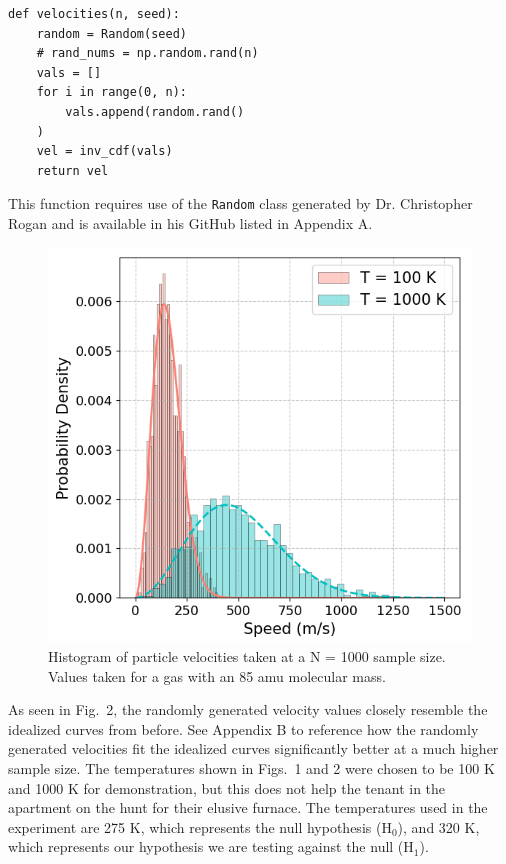 \documentclass[%
 reprint,
 amsmath,amssymb,
 aps,
]{revtex4-2}
\begin{document}
\begin{lstlisting}
def velocities(n, seed):
    random = Random(seed)
    # rand_nums = np.random.rand(n)
    vals = []
    for i in range(0, n):
        vals.append(random.rand()
    )
    vel = inv_cdf(vals)
    return vel
\end{lstlisting}
This function requires use of the \lstinline{Random} class generated by Dr. Christopher Rogan and is available in his GitHub listed in Appendix A. 


\begin{figure}[h]
\caption{Histogram of particle velocities taken at a N = 1000 sample size. Values taken for a gas with an 85 amu molecular mass.}
\centering
	\includegraphics[scale=0.51]{code1}
\end{figure}

As seen in Fig.\ 2, the randomly generated velocity values closely resemble the idealized curves from before. See Appendix B to reference how the randomly generated velocities fit the idealized curves significantly better at a much higher sample size. The temperatures shown in Figs.\ 1 and 2 were chosen to be 100 K and 1000 K for demonstration, but this does not help the tenant in the apartment on the hunt for their elusive furnace. The temperatures used in the experiment are 275 K, which represents the null hypothesis (H$_0$), and 320 K, which represents our hypothesis we are testing against the null (H$_1$).
\end{document}
